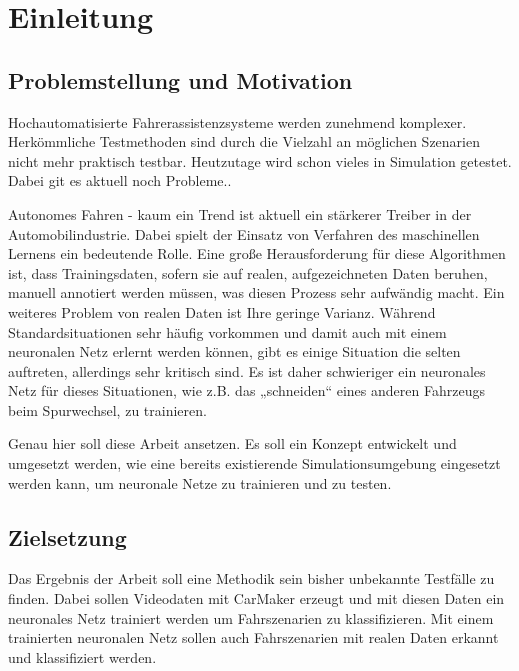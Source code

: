
\chapter{Einleitung}
\label{einleitung}


\section{Problemstellung und Motivation}
\label{einleitung_problemstellung}

Hochautomatisierte Fahrerassistenzsysteme werden zunehmend komplexer. Herkömmliche Testmethoden sind durch die Vielzahl an möglichen Szenarien nicht mehr praktisch testbar. Heutzutage wird schon vieles in Simulation getestet. Dabei git es aktuell noch Probleme..

Autonomes Fahren - kaum ein Trend ist aktuell ein stärkerer Treiber in der Automobilindustrie. Dabei spielt der Einsatz von Verfahren des maschinellen Lernens ein bedeutende Rolle. Eine große Herausforderung für diese Algorithmen ist, dass Trainingsdaten, sofern sie auf realen, aufgezeichneten Daten beruhen, manuell annotiert werden müssen, was diesen Prozess sehr aufwändig macht. Ein weiteres Problem von realen Daten ist Ihre geringe Varianz. Während Standardsituationen sehr häufig vorkommen und damit auch mit einem neuronalen Netz erlernt werden können, gibt es einige Situation die selten auftreten, allerdings sehr kritisch sind. Es ist daher schwieriger ein neuronales Netz für dieses Situationen, wie z.B. das „schneiden“ eines anderen Fahrzeugs beim Spurwechsel, zu trainieren.

Genau hier soll diese Arbeit ansetzen. Es soll ein Konzept entwickelt und umgesetzt werden, wie eine bereits existierende Simulationsumgebung eingesetzt werden kann, um neuronale Netze zu trainieren und zu testen.


\section{Zielsetzung}
\label{einleitung_zielsetzung}

Das Ergebnis der Arbeit soll eine Methodik sein bisher unbekannte Testfälle zu finden. Dabei sollen Videodaten mit CarMaker erzeugt und mit diesen Daten ein neuronales Netz trainiert werden um Fahrszenarien zu klassifizieren. Mit einem trainierten neuronalen Netz sollen auch Fahrszenarien mit realen Daten erkannt und klassifiziert werden.

